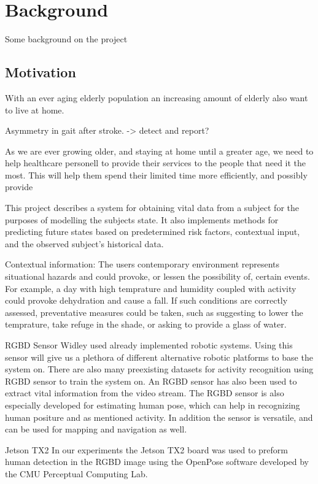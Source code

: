\chapter{Background}
Some background on the project

\section{Motivation}
With an ever aging elderly population an increasing amount of elderly also want to live at home. 

Asymmetry in gait after stroke. -> detect and report?





As we are ever growing older, and staying at home until a greater age, we need to help healthcare personell to provide their services to the people that need it the most. This will help them spend their limited time more efficiently, and possibly provide 

This project describes a system for obtaining vital data from a subject for the purposes of modelling the subjects state. It also implements methods for predicting future states based on predetermined risk factors, contextual input, and the observed subject's historical data.


Contextual information: The users contemporary environment represents situational hazards and could provoke, or lessen the possibility of, certain events. For example, a day with high temprature and humidity coupled with activity could provoke dehydration and cause a fall. If such conditions are correctly assessed, preventative measures could be taken, such as suggesting to lower the temprature, take refuge in the shade, or asking to provide a glass of water.


RGBD Sensor
Widley used already implemented robotic systems. Using this sensor will give us a plethora of different alternative robotic platforms to base the system on. There are also many preexisting datasets for activity recognition using RGBD sensor to train the system on. An RGBD sensor has also been used to extract vital information from the video stream.
The RGBD sensor is also especially developed for estimating human pose, which can help in recognizing human positure and as mentioned activity.
In addition the sensor is versatile, and can be used for mapping and navigation as well.

Jetson TX2
In our experiments the Jetson TX2 board was used to preform human detection in the RGBD image using the OpenPose software developed by the CMU Perceptual Computing Lab. 

